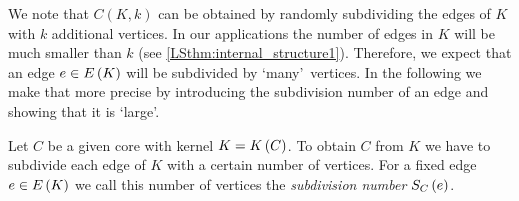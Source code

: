 We note that $C(K,k)$ can be obtained by randomly subdividing the edges of $K$ with $k$ additional vertices. In our applications the number of edges in $K$ will be much smaller than $k$ (see \ref{LSthm:internal_structure1}). Therefore, we expect that an edge $e\in E\left(K\right)$ will be subdivided by \lq many\rq\ vertices. In the following we make that more precise by introducing the subdivision number of an edge and showing that it is \lq large\rq.

\begin{definition}
Let $C$ be a given core with kernel $K=K\left(C\right)$. To obtain $C$ from $K$ we have to subdivide each edge of $K$ with a certain number of vertices. For a fixed edge $e\in E\left(K\right)$ we call this number of vertices the {\em subdivision number} $S_{C}\left(e\right)$.
\end{definition}

